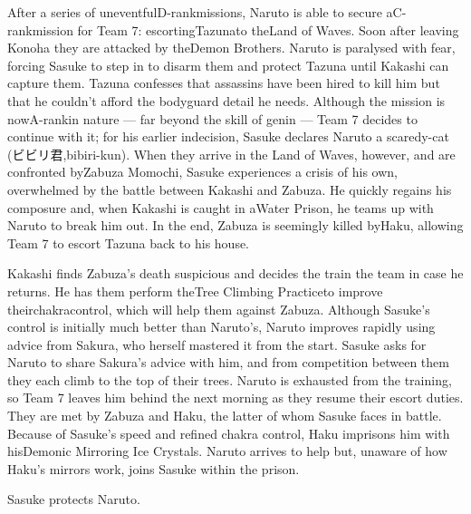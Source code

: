 \documentclass[a4paper,12pt]{article}
\begin{document}
After a series of uneventfulD-rankmissions, Naruto is able to secure aC-rankmission for Team 7: escortingTazunato theLand of Waves. Soon after leaving Konoha they are attacked by theDemon Brothers. Naruto is paralysed with fear, forcing Sasuke to step in to disarm them and protect Tazuna until Kakashi can capture them. Tazuna confesses that assassins have been hired to kill him but that he couldn't afford the bodyguard detail he needs. Although the mission is nowA-rankin nature — far beyond the skill of genin — Team 7 decides to continue with it; for his earlier indecision, Sasuke declares Naruto a scaredy-cat (ビビリ君,bibiri-kun). When they arrive in the Land of Waves, however, and are confronted byZabuza Momochi, Sasuke experiences a crisis of his own, overwhelmed by the battle between Kakashi and Zabuza. He quickly regains his composure and, when Kakashi is caught in aWater Prison, he teams up with Naruto to break him out. In the end, Zabuza is seemingly killed byHaku, allowing Team 7 to escort Tazuna back to his house.\\ \par \vspace{0.5cm}

Kakashi finds Zabuza's death suspicious and decides the train the team in case he returns. He has them perform theTree Climbing Practiceto improve theirchakracontrol, which will help them against Zabuza. Although Sasuke's control is initially much better than Naruto's, Naruto improves rapidly using advice from Sakura, who herself mastered it from the start. Sasuke asks for Naruto to share Sakura's advice with him, and from competition between them they each climb to the top of their trees. Naruto is exhausted from the training, so Team 7 leaves him behind the next morning as they resume their escort duties. They are met by Zabuza and Haku, the latter of whom Sasuke faces in battle. Because of Sasuke's speed and refined chakra control, Haku imprisons him with hisDemonic Mirroring Ice Crystals. Naruto arrives to help but, unaware of how Haku's mirrors work, joins Sasuke within the prison.\\ \par \vspace{0.5cm}

Sasuke protects Naruto.\\ \par \vspace{0.5cm}
\end{document}
